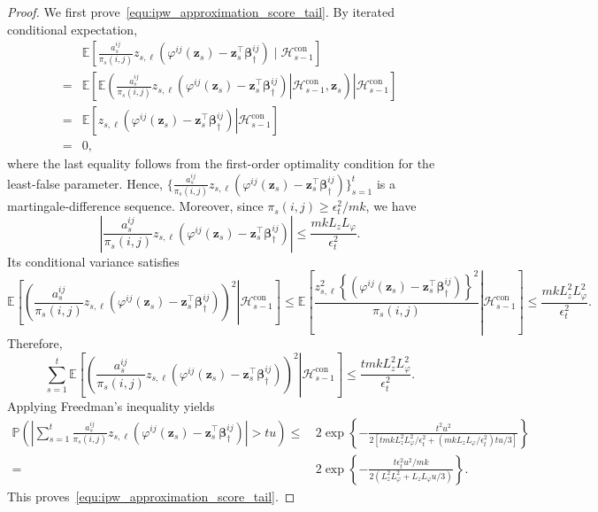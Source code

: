 \documentclass[10pt,a4paper]{amsart}
\begin{document}
\begin{proof}
We first prove~\eqref{equ:ipw_approximation_score_tail}. 
By iterated conditional expectation,
\begin{align*}
& \mathbb E
\left[
\frac{ a_s^{ij} }{ \pi_s(i,j) } z_{s,\ell} \left(\varphi^{ij}(\bm z_s) - \bm z_s^\top\bm\beta_\dagger^{ij} \right)
\mid
\mathcal H_{s-1}^{\mathrm{con}}
\right] \\
=&
\mathbb E
\left[\left.
\mathbb E\left(
\left.\frac{a_s^{ij}}{\pi_s(i,j)}z_{s,\ell}
\left(\varphi^{ij}(\bm z_s) - \bm z_s^\top\bm\beta_\dagger^{ij} \right)
\right|
\mathcal H_{s-1}^{\mathrm{con}},\bm z_s
\right)\right|\mathcal H_{s-1}^{\mathrm{con}}\right] \\
=&
\mathbb E
\left[
z_{s,\ell} \left.
\left(\varphi^{ij}(\bm z_s) - \bm z_s^\top\bm\beta_\dagger^{ij} \right) \right|\mathcal H_{s-1}^{\mathrm{con}} 
\right] \\
=& 0,
\end{align*}
where the last equality follows from the first-order optimality condition for the least-false parameter. Hence, $\{\frac{ a_s^{ij} }{ \pi_s(i,j) } z_{s,\ell} \left(\varphi^{ij}(\bm z_s) - \bm z_s^\top\bm\beta_\dagger^{ij} \right)\}_{s=1}^t$ is a martingale-difference sequence.
Moreover, since $\pi_s(i,j) \ge {\epsilon_t^2}/{mk}$, we have
\[
\left|
\frac{ a_s^{ij} }{ \pi_s(i,j) } z_{s,\ell} \left(\varphi^{ij}(\bm z_s) - \bm z_s^\top\bm\beta_\dagger^{ij} \right)
\right|
\le
\frac{mk L_zL_\varphi}{\epsilon_t^2}.
\]
Its conditional variance satisfies
\small{
\begin{equation*}
\mathbb E
\left[
\left.
\left(
\frac{ a_s^{ij} }{ \pi_s(i,j) } z_{s,\ell} \left(\varphi^{ij}(\bm z_s) - \bm z_s^\top\bm\beta_\dagger^{ij} \right)
\right)^2
\right|
\mathcal H_{s-1}^{\mathrm{con}}
\right]
\le
\mathbb E
\left[
\left.
\frac{
z_{s,\ell}^2
\left\{
\left(\varphi^{ij}(\bm z_s) - \bm z_s^\top\bm\beta_\dagger^{ij} \right)
\right\}^2}{\pi_s(i,j)}
\right|
\mathcal H_{s-1}^{\mathrm{con}}
\right]
\le 
\frac{mk L_z^2L_\varphi^2}{\epsilon_t^2}.
\end{equation*}
}
Therefore,
\[
\sum_{s=1}^t
\mathbb E
\left[
\left.
\left(
\frac{ a_s^{ij} }{ \pi_s(i,j) } z_{s,\ell} \left(\varphi^{ij}(\bm z_s) - \bm z_s^\top\bm\beta_\dagger^{ij} \right)
\right)^2
\right|
\mathcal H_{s-1}^{\mathrm{con}}
\right]
\le
\frac{tmkL_z^2L_\varphi^2}{\epsilon_t^2}.
\]
Applying Freedman's inequality yields
\begin{align*}
\mathbb P
\left(
\left|
\sum_{s=1}^t
\frac{ a_s^{ij} }{ \pi_s(i,j) } z_{s,\ell} \left(\varphi^{ij}(\bm z_s) - \bm z_s^\top\bm\beta_\dagger^{ij} \right)
\right|>tu
\right)
\le & \,
2\exp
\left\{
-
\frac{t^2u^2}{2\left[tmkL_z^2L_\varphi^2/\epsilon_t^2
+ (mk L_zL_\varphi/\epsilon_t^2)tu/3
\right]
}
\right\}
\\
= & \,
2\exp\left\{
-\frac{t\epsilon_t^2u^2/mk}{2\left(L_z^2L_\varphi^2+L_zL_\varphi u/3\right)}
\right\}.
\end{align*}
This proves~\eqref{equ:ipw_approximation_score_tail}.


\end{proof}
\end{document}
